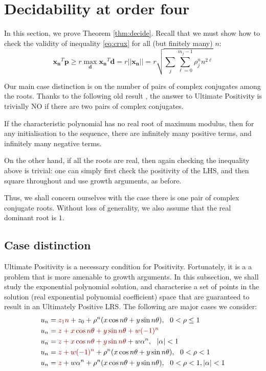 \section{Decidability at order four}
\label{section:decidability}
In this section, we prove Theorem \ref{thm:decide}. Recall that we must show how to check the validity of inequality \ref{eq:crux} for all (but finitely many) $n$:
$$
\mathbf{x_n}^T\mathbf{p} \ge r\max_{\mathbf{d}}\mathbf{x_n}^T\mathbf{d} = r ||\mathbf{x_n}|| = r \sqrt{\sum_{j} \sum_{\ell=0}^{m_j-1} \rho_j^n n^{2\ell}}
$$

Our main case distinction is on the number of pairs of complex conjugates among the roots. Thanks to the following old result \cite[Thm. 2]{positive-dominant}, the answer to Ultimate Positivity is trivially NO if there are two pairs of complex conjugates.

\begin{proposition}[Folklore]
If the characteristic polynomial has no real root of maximum modulus, then for any initialisation to the sequence, there are infinitely many positive terms, and infinitely many negative terms.
\end{proposition}

On the other hand, if all the roots are real, then again checking the inequality above is trivial: one can simply first check the positivity of the LHS, and then square throughout and use growth arguments, as before. 

Thus, we shall concern ourselves with the case there is one pair of complex conjugate roots. Without loss of generality, we also assume that the real dominant root is $1$.

\subsection{Case distinction}
Ultimate Positivity is a necessary condition for Positivity. Fortunately, it is a a problem that is more amenable to growth arguments. In this subsection, we shall study the exponential polynomial solution, and characterise a set of points in the solution (real exponential polynomial coefficient) space that are guaranteed to result in an Ultimately Positive LRS. The following are major cases we consider:
\begin{align}
\label{eq:unityrep}
u_n &= {\color{red!50!black} z_1 n} + z_0 + \rho^n (x \cos n\theta + y \sin n \theta), ~~ 0< \rho \le 1 \\
\label{eq:fourdom}
u_n &= {\color{red!50!black} z + x\cos n\theta + y\sin n\theta + w(-1)^n} \\
\label{eq:threedom}
u_n &= {\color{red!50!black} z + x\cos n\theta + y\sin n\theta} + w\alpha^n, ~~|\alpha| < 1 \\
\label{eq:twodom}
u_n &= {\color{red!50!black}z + w(-1)^n} + \rho^n(x\cos n\theta + y\sin n\theta), ~~ 0< \rho < 1 \\
\label{eq:onedom}
u_n &= {\color{red!50!black}z} + w\alpha^n + \rho^n(x\cos n\theta + y\sin n\theta), ~~ 0< \rho < 1, |\alpha| < 1
\end{align}

